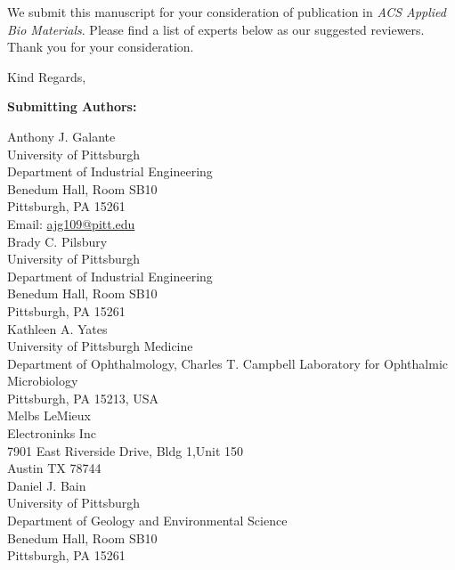 \documentclass[11pt]{letter}
\begin{document}
\begin{letter}{}
We submit this manuscript for your consideration of publication in %
\textit{ACS Applied Bio Materials}.
Please find a list of experts below as our suggested reviewers.
Thank you for your consideration.

\closing{Kind Regards,}


\end{letter}

\newpage

\textbf{Submitting Authors:}

Anthony J. Galante\\
University of Pittsburgh \\
Department of Industrial Engineering \\
Benedum Hall, Room SB10 \\
Pittsburgh, PA 15261\\
Email:  \href{mailto:ajg109@pitt.edu}{ajg109@pitt.edu}\\

Brady C. Pilsbury \\
University of Pittsburgh \\
Department of Industrial Engineering \\
Benedum Hall, Room SB10 \\
Pittsburgh, PA 15261\\

Kathleen A. Yates\\
University of Pittsburgh Medicine\\
Department of Ophthalmology, Charles T. Campbell Laboratory for Ophthalmic Microbiology\\
Pittsburgh, PA 15213, USA\\

Melbs LeMieux \\
Electroninks Inc \\ 
7901 East Riverside Drive, Bldg 1,Unit 150\\
Austin TX  78744 \\

Daniel J. Bain \\
University of Pittsburgh \\
Department of Geology and Environmental Science\\
Benedum Hall, Room SB10 \\
Pittsburgh, PA 15261\\
\end{document}
